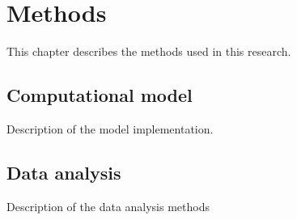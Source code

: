 \chapter{Methods}

This chapter describes the methods used in this research.

\section{Computational model}
Description of the \textcite{sanjayImpairedDendriticInhibition2015} model
implementation.

\section{Data analysis}
Description of the data analysis methods

